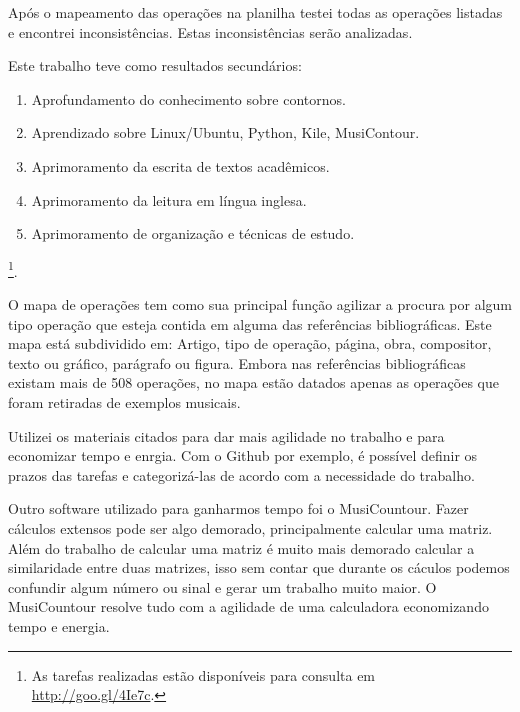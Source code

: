 \documentclass[11pt]{article}
\begin{document}
Após o mapeamento das operações na planilha testei todas as operações
listadas e encontrei inconsistências.
Estas inconsistências serão analizadas.

Este trabalho teve como resultados secundários:

\begin{enumerate}
\item Aprofundamento do conhecimento sobre contornos.
\item Aprendizado sobre Linux/Ubuntu, Python, Kile, MusiContour.
\item Aprimoramento da escrita de textos acadêmicos.
\item Aprimoramento da leitura em língua inglesa.
\item Aprimoramento de organização e técnicas de estudo.
\end{enumerate}
\footnote{As tarefas realizadas estão disponíveis para consulta em
  \url{http://goo.gl/4Ie7c}.}.

\label{sec:discussao}

O mapa de operações tem como sua principal função agilizar a procura por
algum tipo operação que esteja contida em alguma das referências bibliográficas.
Este mapa está subdividido em: Artigo, tipo de operação, página, obra, compositor,
texto ou gráfico, parágrafo ou figura. Embora nas referências bibliográficas existam
mais de 508 operações, no mapa estão datados apenas as operações que foram retiradas
de exemplos musicais.

Utilizei os materiais citados para dar mais agilidade no trabalho e para
economizar tempo e enrgia. Com o Github por exemplo, é possível definir os
prazos das tarefas e categorizá-las de acordo com a necessidade do trabalho.

Outro software utilizado para ganharmos tempo foi o MusiCountour. Fazer cálculos
extensos pode ser algo demorado, principalmente calcular uma matriz. Além do trabalho
de calcular uma matriz é muito mais demorado calcular a similaridade entre duas matrizes,
isso sem contar que durante os cáculos podemos confundir algum número ou sinal e gerar um
trabalho muito maior. O MusiCountour resolve tudo com a agilidade de uma calculadora
economizando tempo e energia.
\end{document}
